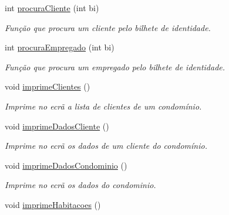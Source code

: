 \begin{DoxyCompactItemize}
int \hyperlink{class_interface_af478030a7565af1f96580afaafdd0cde}{procura\+Cliente} (int bi)
\begin{DoxyCompactList}\small\item\em Função que procura um cliente pelo bilhete de identidade. \end{DoxyCompactList}\item 
int \hyperlink{class_interface_a3f5893a482f5a1b2161dfcea02b79746}{procura\+Empregado} (int bi)
\begin{DoxyCompactList}\small\item\em Função que procura um empregado pelo bilhete de identidade. \end{DoxyCompactList}\item 
void \hyperlink{class_interface_adc4b93f87de9383d2d450435f38de4b3}{imprime\+Clientes} ()\hypertarget{class_interface_adc4b93f87de9383d2d450435f38de4b3}{}\label{class_interface_adc4b93f87de9383d2d450435f38de4b3}

\begin{DoxyCompactList}\small\item\em Imprime no ecrã a lista de clientes de um condomínio. \end{DoxyCompactList}\item 
void \hyperlink{class_interface_ad534a51f3ad3d4127764dfeb8ec6889c}{imprime\+Dados\+Cliente} ()\hypertarget{class_interface_ad534a51f3ad3d4127764dfeb8ec6889c}{}\label{class_interface_ad534a51f3ad3d4127764dfeb8ec6889c}

\begin{DoxyCompactList}\small\item\em Imprime no ecrã os dados de um cliente do condomínio. \end{DoxyCompactList}\item 
void \hyperlink{class_interface_aed67f4ad69432e696dee93694029fb2e}{imprime\+Dados\+Condominio} ()\hypertarget{class_interface_aed67f4ad69432e696dee93694029fb2e}{}\label{class_interface_aed67f4ad69432e696dee93694029fb2e}

\begin{DoxyCompactList}\small\item\em Imprime no ecrã os dados do condominio. \end{DoxyCompactList}\item 
void \hyperlink{class_interface_a45714f2fad37ed40fa88432d3c2cf26f}{imprime\+Habitacoes} ()\hypertarget{class_interface_a45714f2fad37ed40fa88432d3c2cf26f}{}\label{class_interface_a45714f2fad37ed40fa88432d3c2cf26f}


\end{DoxyCompactItemize}
